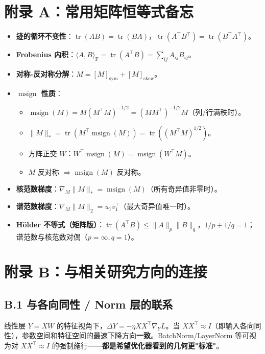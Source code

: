 \documentclass[11pt,a4paper]{article}
\theoremstyle{mythm}
\theoremstyle{mydef}
\newcommand{\tr}{\operatorname{tr}}
\newcommand{\msign}{\operatorname{msign}}
\newcommand{\inner}[2]{\langle #1, #2 \rangle}
\newcommand{\Frob}{\mathrm{F}}
\newcommand{\nuc}{\ast}
\begin{document}
\appendix

\section{附录 A：常用矩阵恒等式备忘}

\begin{itemize}[leftmargin=2em]
\item \textbf{迹的循环不变性}：$\tr(AB)=\tr(BA)$，$\tr(A^\top B^\top)=\tr(B^\top A^\top)$。
\item \textbf{Frobenius 内积}：$\inner{A}{B}_\Frob = \tr(A^\top B) = \sum_{ij}A_{ij}B_{ij}$。
\item \textbf{对称-反对称分解}：$M = [M]_{\mathrm{sym}} + [M]_{\mathrm{skew}}$。
\item \textbf{$\msign$ 性质}：
  \begin{itemize}[leftmargin=1.5em]
  \item $\msign(M) = M(M^\top M)^{-1/2} = (MM^\top)^{-1/2} M$（列/行满秩时）。
  \item $\|M\|_\nuc = \tr(M^\top \msign(M)) = \tr((M^\top M)^{1/2})$。
  \item 方阵正交 $W$：$W^\top \msign(M) = \msign(W^\top M)$。
  \item $M$ 反对称 $\Rightarrow \msign(M)$ 反对称。
  \end{itemize}
\item \textbf{核范数梯度}：$\nabla_M \|M\|_\nuc = \msign(M)$（所有奇异值非零时）。
\item \textbf{谱范数梯度}：$\nabla_M \|M\|_2 = u_1 v_1^\top$（最大奇异值唯一时）。
\item \textbf{Hölder 不等式（矩阵版）}：$\tr(A^\top B) \le \|A\|_p \|B\|_q$，$1/p+1/q=1$；谱范数与核范数对偶（$p=\infty,q=1$）。
\end{itemize}

\section{附录 B：与相关研究方向的连接}

\subsection*{B.1 与各向同性 / Norm 层的联系}
线性层 $Y = XW$ 的特征视角下，$\Delta Y = -\eta X X^\top \nabla_Y L$。当 $XX^\top \approx I$（即输入各向同性），参数空间和特征空间的最速下降方向\textbf{一致}。BatchNorm/LayerNorm 等可视为对 $XX^\top \approx I$ 的强制施行——\textbf{都是希望优化器看到的几何更"标准"}。
\end{document}

